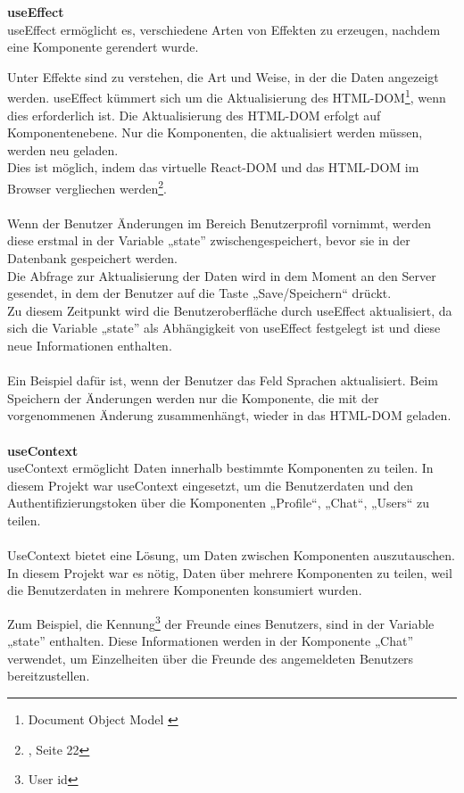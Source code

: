 \textbf{useEffect}
\\
useEffect ermöglicht es, verschiedene Arten von Effekten zu erzeugen, nachdem eine Komponente gerendert wurde.

Unter Effekte sind zu verstehen, die Art und Weise, in der die Daten angezeigt werden. useEffect kümmert sich um die Aktualisierung des HTML-DOM\footnote{Document Object Model {\cite{MO2}}}, wenn dies erforderlich ist. Die Aktualisierung des HTML-DOM erfolgt auf Komponentenebene. Nur die Komponenten, die aktualisiert werden müssen, werden neu geladen. 
\\
Dies ist möglich, indem  das virtuelle React-DOM{\cite{R06}} und das HTML-DOM im Browser vergliechen werden\footnote{{\cite{AN1}, Seite 22}}.
\\\\
Wenn der Benutzer Änderungen im Bereich Benutzerprofil vornimmt, werden diese erstmal in der Variable „state” zwischengespeichert, bevor sie in der Datenbank gespeichert werden.
\\
Die Abfrage zur Aktualisierung der Daten wird in dem Moment an den Server gesendet, in dem der Benutzer auf die Taste „Save/Speichern“ drückt.
\\
Zu diesem Zeitpunkt wird die Benutzeroberfläche durch useEffect aktualisiert, da sich die Variable „state” als Abhängigkeit von useEffect festgelegt ist und diese neue Informationen enthalten.
\\\\
Ein Beispiel dafür ist, wenn der Benutzer das Feld Sprachen aktualisiert. Beim Speichern der Änderungen werden nur die Komponente, die mit der vorgenommenen Änderung zusammenhängt, wieder in das HTML-DOM geladen.
\\\\

\textbf{useContext}
\\
useContext ermöglicht Daten innerhalb bestimmte Komponenten zu teilen.
In diesem Projekt war useContext eingesetzt, um die Benutzerdaten und den Authentifizierungstoken über die Komponenten  „Profile“, „Chat“, „Users“ zu teilen.
\\\\
UseContext bietet eine Lösung, um Daten zwischen Komponenten auszutauschen.{\cite{R04}}
\\
In diesem Projekt war es nötig, Daten über mehrere Komponenten zu teilen, weil die Benutzerdaten in mehrere Komponenten konsumiert wurden.

\newpage
Zum Beispiel, die Kennung\footnote{User id} der Freunde eines Benutzers, sind in der Variable „state” enthalten. Diese Informationen werden in der Komponente „Chat” verwendet, um Einzelheiten über die Freunde des angemeldeten Benutzers bereitzustellen. 
 
